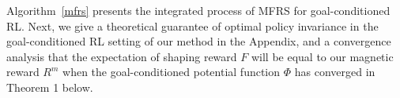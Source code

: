 \documentclass[journal]{IEEEtran}
\begin{document}
Algorithm~\ref{mfrs} presents the integrated process of MFRS for goal-conditioned RL.
Next, we give a theoretical guarantee of optimal policy invariance in the goal-conditioned RL setting of our method in the Appendix, and a convergence analysis that the expectation of shaping reward $F$ will be equal to our magnetic reward $R^{m}$ when the goal-conditioned potential function $\Phi$ has converged in Theorem 1 below.
\end{document}

